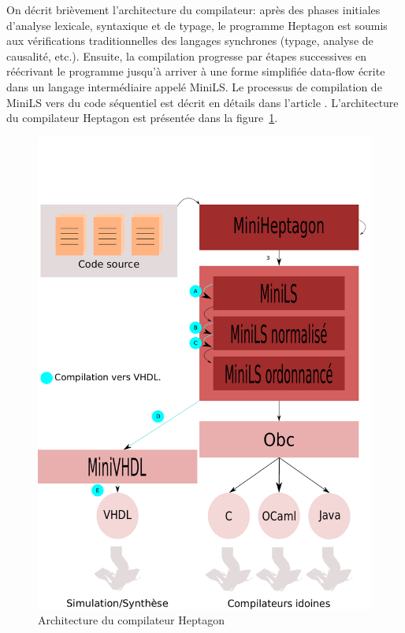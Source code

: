 \documentclass[a4paper]{article}
\newcommand{\LANG}{{\sc Heptagon}}
\newcommand{\minils}{{\sc MiniLS}}
\begin{document}
On d\'ecrit bri\`evement l'architecture du compilateur: apr\`es des phases
initiales d'analyse lexicale, syntaxique et de typage, le programme
\LANG{} est soumis aux v\'erifications traditionnelles des langages
synchrones (typage, analyse de causalit\'e, etc.). Ensuite, la
compilation progresse par \'etapes successives en r\'e\'ecrivant le
programme jusqu'\`a arriver \`a une forme simplifi\'ee data-flow \'ecrite dans
un langage interm\'ediaire appel\'e \minils. Le processus de compilation
de \minils{} vers du code s\'equentiel est d\'ecrit en d\'etails dans
l'article \cite{lucy:lctes08a}. L'architecture du compilateur \LANG{}
est pr\'esent\'ee dans la figure~\ref{fig:archi}.


\begin{figure}[t]
  \centering
  \includegraphics[scale=0.5]{archi}
  \caption{Architecture du compilateur \LANG}
  \label{fig:archi}
\end{figure}
\end{document}

